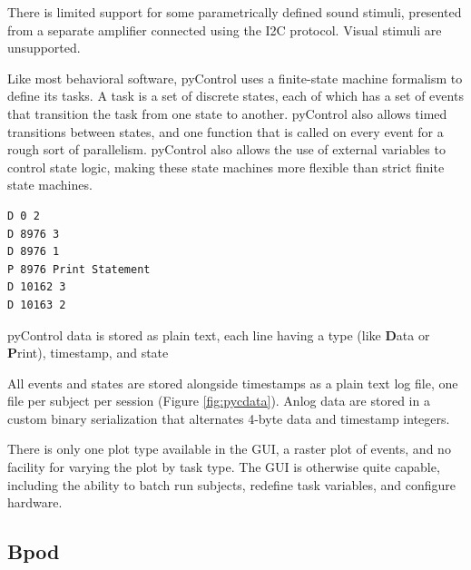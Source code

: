 There is limited support for some parametrically defined sound stimuli, presented from a separate amplifier connected using the I2C protocol. Visual stimuli are unsupported.

Like most behavioral software, pyControl uses a finite-state machine formalism to define its tasks. A task is a set of discrete states, each of which has a set of events that transition the task from one state to another. pyControl also allows timed transitions between states, and one function that is called on every event for a rough sort of parallelism. pyControl also allows the use of external variables to control state logic, making these state machines more flexible than strict finite state machines.

\begin{marginfigure}[-0.4cm]
\begin{verbatim}
D 0 2
D 8976 3
D 8976 1
P 8976 Print Statement
D 10162 3
D 10163 2
\end{verbatim}
\caption{pyControl data is stored as plain text, each line having a type (like \textbf{D}ata or \textbf{P}rint), timestamp, and state}
\label{fig:pycdata}
\end{marginfigure}

All events and states are stored alongside timestamps as a plain text log file, one file per subject per session (Figure \ref{fig:pycdata}). Anlog data are stored in a custom binary serialization that alternates 4-byte data and timestamp integers.

There is only one plot type available in the GUI, a raster plot of events, and no facility for varying the plot by task type. The GUI is otherwise quite capable, including the ability to batch run subjects, redefine task variables, and configure hardware.\\

\subsection{Bpod}

